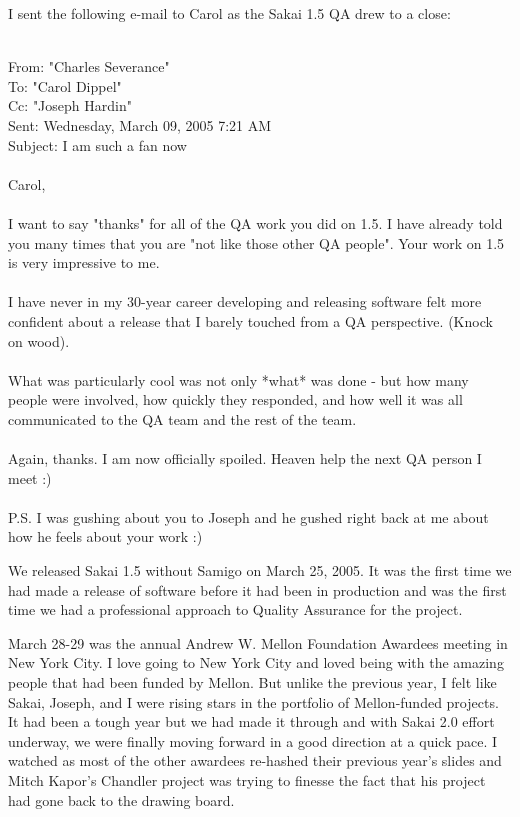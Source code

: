 \documentclass[12pt]{book}
\begin{document}
I sent the following e-mail to Carol as the Sakai 1.5
QA drew to a close:\\
\\
\begin{sf}
From: "Charles Severance"\\
To: "Carol Dippel"\\
Cc: "Joseph Hardin"\\
Sent: Wednesday, March 09, 2005 7:21 AM\\
Subject: I am such a fan now\\
\\
Carol,\\
\\
I want to say "thanks" for all of the QA work you did
on 1.5.  I have already told you many times that you
are "not like those other QA people". Your work
on 1.5 is very impressive to me.\\
\\
I have never in my 30-year career developing and
releasing software felt more confident about a
release that I barely touched from a QA perspective.
(Knock on wood).\\
\\
What was particularly cool was not only *what* was
done - but how many people were involved, how
quickly they responded, and how well it was
all communicated to the QA team and the rest
of the team.\\
\\
Again, thanks. I am now officially spoiled.  Heaven
help the next QA person I meet :)\\
\\
P.S.  I was gushing about you to Joseph and he gushed
right back at me about how he feels about your work :)\\
\end{sf}

We released Sakai 1.5 without Samigo on March 25, 2005.
It was the first time we had made a release of software
before it had been in production and was the first time
we had a professional approach to Quality Assurance
for the project.

March 28-29 was the annual Andrew W. Mellon Foundation
Awardees meeting in New York City.  I love going to New York
City and loved being with the amazing people that had been
funded by Mellon.  But unlike the previous year, I felt
like Sakai, Joseph, and I were rising stars in the
portfolio of Mellon-funded projects.  It had been a tough year
but we had made it through and with Sakai 2.0 effort underway,
we were finally moving forward in a good direction
at a quick pace.  I watched
as most of the other awardees re-hashed their previous year's
slides and Mitch Kapor's Chandler project
was trying to finesse the fact that his project had
gone back to the drawing board.
\end{document}
